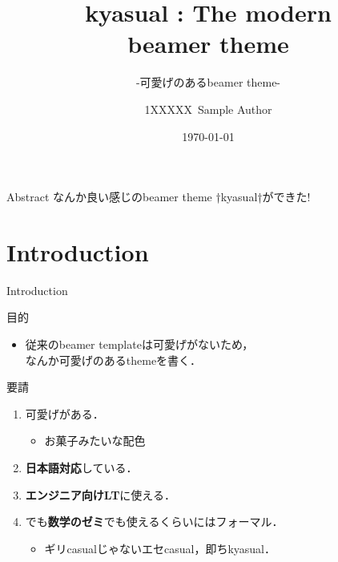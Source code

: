 \documentclass[aspectratio=1610,14pt]{beamer}
\title{%
    kyasual : The modern\\ beamer theme
}
\subtitle{
    -可愛げのあるbeamer theme-
}
\author{%
    1XXXXX\ Sample Author
}
\institute[Sample Univ.]{%
    Sample Univ. 
}
\date{%
    \today
}
\begin{document}
%
%
\begin{frame}
\maketitle 
\end{frame}

\begin{frame}[fragile]{Abstract}
        なんか良い感じのbeamer theme †\alert{kyasual}†ができた!
\end{frame}

\section{Introduction}

\begin{frame}
    \tableofcontents[currentsection]
\end{frame}

\begin{frame}{Introduction}
    \begin{textblock}{目的}
        \begin{itemize}
            \item{従来のbeamer templateは可愛げがないため，\\なんか\alert{可愛げのある}themeを書く．}
        \end{itemize}
    \end{textblock}
    \begin{textblock}{要請}
        \begin{enumerate}
            \item{\alert{可愛げがある．}}
                \begin{itemize}
                    \item{お菓子みたいな配色}
                \end{itemize}
            \item{\textbf{日本語対応}している．}
            \item{\textbf{エンジニア向けLT}に使える．}
            \item{でも\textbf{数学のゼミ}でも使えるくらいには\alert{フォーマル}．}
                \begin{itemize}
                    \item{ギリcasualじゃないエセcasual，即ちkyasual．}
                \end{itemize}
        \end{enumerate}
    \end{textblock}
\end{frame}
\end{document}
